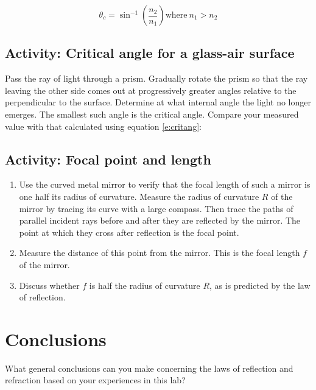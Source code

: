 \begin{multicols}{2}
\begin{equation} \label{e:critang}
	\theta_c = \sin^{-1} \left(\frac{n_2}{n_1}\right) \text{where} \ n_1 > n_2
\end{equation}
	 

\subsection{Activity: Critical angle for a glass-air surface}
Pass the ray of light through a prism.  Gradually rotate the prism so that the ray leaving the other side comes out at progressively greater angles relative to the perpendicular to the surface.  Determine at what internal angle the light no longer emerges.  The smallest such angle is the critical angle.  Compare your measured value with that calculated using equation \ref{e:critang}:

\subsection{Activity: Focal point and length}
\begin{enumerate}
	 \item 	Use the curved metal mirror to verify that the focal length of such a mirror is one half its radius of curvature.  Measure the radius of curvature $R$ of the mirror by tracing its curve with a large compass.  Then trace the paths of parallel incident rays before and after they are reflected by the mirror.  The point at which they cross after reflection is the focal point.  
	 \item Measure the distance of this point from the mirror.  This is the focal length $f$ of the mirror.  
	 \item Discuss whether $f$ is half the radius of curvature $R$, as is predicted by the law of reflection.
\end{enumerate}
	
\section{Conclusions}
  What general conclusions can you make concerning the laws of reflection and refraction based on your experiences in this lab?
 
\end{multicols} 
\endinput
